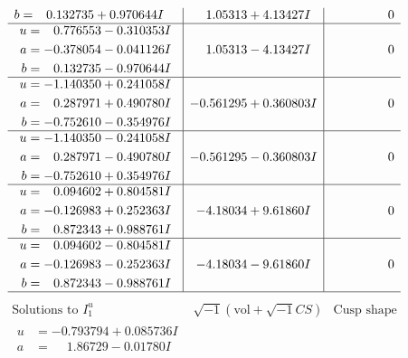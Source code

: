\documentclass[1p]{elsarticle_modified}
\theoremstyle{definition}
\newcommand{\I}{\sqrt{-1}}
\begin{document}
$$\begin{array}{c|c|c}
\begin{aligned}
b &= \phantom{-}0.132735 + 0.970644 I\end{aligned}
 & \phantom{-}1.05313 + 4.13427 I & \phantom{-0.000000 } 0 \\ \hline\begin{aligned}
u &= \phantom{-}0.776553 - 0.310353 I \\
a &= -0.378054 - 0.041126 I \\
b &= \phantom{-}0.132735 - 0.970644 I\end{aligned}
 & \phantom{-}1.05313 - 4.13427 I & \phantom{-0.000000 } 0 \\ \hline\begin{aligned}
u &= -1.140350 + 0.241058 I \\
a &= \phantom{-}0.287971 + 0.490780 I \\
b &= -0.752610 - 0.354976 I\end{aligned}
 & -0.561295 + 0.360803 I & \phantom{-0.000000 } 0 \\ \hline\begin{aligned}
u &= -1.140350 - 0.241058 I \\
a &= \phantom{-}0.287971 - 0.490780 I \\
b &= -0.752610 + 0.354976 I\end{aligned}
 & -0.561295 - 0.360803 I & \phantom{-0.000000 } 0 \\ \hline\begin{aligned}
u &= \phantom{-}0.094602 + 0.804581 I \\
a &= -0.126983 + 0.252363 I \\
b &= \phantom{-}0.872343 + 0.988761 I\end{aligned}
 & -4.18034 + 9.61860 I & \phantom{-0.000000 } 0 \\ \hline\begin{aligned}
u &= \phantom{-}0.094602 - 0.804581 I \\
a &= -0.126983 - 0.252363 I \\
b &= \phantom{-}0.872343 - 0.988761 I\end{aligned}
 & -4.18034 - 9.61860 I & \phantom{-0.000000 } 0\\
 \hline 
 \end{array}$$\newpage$$\begin{array}{c|c|c}  
\text{Solutions to }I^u_{1}& \I (\text{vol} + \sqrt{-1}CS) & \text{Cusp shape}\\
 \hline 
\begin{aligned}
u &= -0.793794 + 0.085736 I \\
a &= \phantom{-}1.86729 - 0.01780 I \\

\end{aligned}
\end{array}$$
\end{document}
